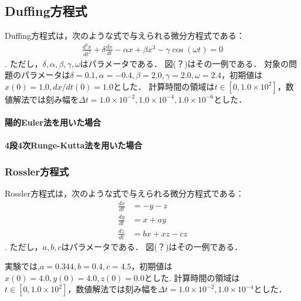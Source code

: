 \subsection{Duffing方程式}
Duffing方程式は，次のような式で与えられる微分方程式である：
\begin{align}
    \frac{d^2 x}{dt^2} + \delta\frac{dx}{dt} - \alpha x + \beta x^3 - \gamma \cos(\omega t) = 0
\end{align}.
ただし，$\delta,\alpha,\beta,\gamma,\omega$はパラメータである．
図(？)はその一例である．
対象の問題のパラメータは$\delta=0.1, \alpha=-0.4, \beta=2.0, \gamma=2.0, \omega=2.4$，初期値は$x(0) = 1.0, dx/dt(0) = 1.0$とした．
計算時間の領域は$t \in [0,1.0 \times 10^2]$，数値解法では刻み幅を$\Delta t =  1.0 \times 10^{-2},1.0 \times 10^{-4}, 1.0 \times 10^{-6}$とした．
\paragraph*{陽的Euler法を用いた場合}

\paragraph*{4段4次Runge-Kutta法を用いた場合}

\subsubsection{Rossler方程式}
Rossler方程式は，次のような式で与えられる微分方程式である：
\begin{align}
    \frac{dx}{dt} &= -y-z \\
    \frac{dy}{dt} &= x+ay \\
    \frac{dz}{dt} &= bx + xz - cz
\end{align}.
ただし，$a,b,c$はパラメータである．
図(？)はその一例である．
\begin{comment}
\begin{figure}
    \centering
    \begin{minipage}[b]{0.49\columnwidth}
        \centering
        \texttt{[image: rossler.png]}
        \caption{Rossler方程式の時間発展の様子}
        \label{fig:rossler1}
    \end{minipage}
    \begin{minipage}[b]{0.49\columnwidth}
        \centering
        \texttt{[image: rossler2.png]}
        \caption{Rossler方程式の時間発展の様子}
        \label{fig:rossler2}
    \end{minipage}
\end{figure}
\end{comment}
実験では,$a=0.344, b=0.4, c=4.5$，初期値は$x(0) = 4.0, y(0) = 4.0, z(0) = 0.0$とした.
計算時間の領域は$t \in [0,1.0 \times 10^2]$，数値解法では刻み幅を$\Delta t =  1.0 \times 10^{-2},1.0 \times 10^{-4}$とした．
